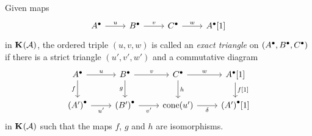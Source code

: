\begin{definition}
  \label{def_exact_triang_homcat}
  Given maps
  \[
    \begin{tikzcd}
      \cochaincomp{A} \arrow[r, "u"]
      & \cochaincomp{B} \arrow[r, "v"]
      & \cochaincomp{C} \arrow[r, "w"]
      & \cochaincomp{A}[1]
    \end{tikzcd}
  \]
  in $\homcat{\abcat{A}}$, the ordered triple $(u, v, w)$ is called
  an \emph{exact triangle} on $({{A}}^{\bullet}, {{B}}^{\bullet},
  {{C}}^{\bullet})$ if there is a strict triangle $(u', v', w')$ and
  a commutative diagram
  \[
    \begin{tikzcd}
      \cochaincomp{A} & \cochaincomp{B} & \cochaincomp{C} &
      {\cochaincomp{A}[1]} \\
      \cochaincomp{(A')} & \cochaincomp{(B')} & \cone{u'} &
      {\cochaincomp{(A')}[1]}
      \arrow["u", from=1-1, to=1-2]
      \arrow["f"', from=1-1, to=2-1]
      \arrow["v", from=1-2, to=1-3]
      \arrow["g"', from=1-2, to=2-2]
      \arrow["w", from=1-3, to=1-4]
      \arrow["h", from=1-3, to=2-3]
      \arrow["{f[1]}", from=1-4, to=2-4]
      \arrow["{u'}"', from=2-1, to=2-2]
      \arrow["{v'}"', from=2-2, to=2-3]
      \arrow["{\delta}"', from=2-3, to=2-4]
    \end{tikzcd}
  \]
  in $\homcat{\abcat{A}}$ such that the maps $f$, $g$ and $h$ are isomorphisms.
\end{definition}

\iffalse
\begin{remark}
  Since choosing maps in $\homcat{\abcat{A}}$ is choosing
  representatives of homotopy equivalence classes from
  $\Ch{\abcat{A}}$, commutative diagrams in $\homcat{\abcat{A}}$ are
  commutative diagrams in $\Ch{\abcat{A}}$ up to a choice of homotopy
  equivalent maps.
\end{remark}
\fi

